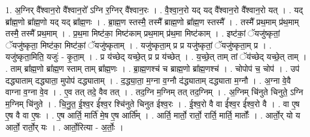 \documentclass[17pt]{extarticle}
\begin{document}
1. अ॒ग्निर् वै᳚श्वान॒रो वै᳚श्वान॒रो᳚ ऽग्नि र॒ग्निर् वै᳚श्वान॒रः । . वै॒श्वा॒न॒रो यद् यद् वै᳚श्वान॒रो वै᳚श्वान॒रो यत् । . यद् ब्रा᳚ह्म॒णो ब्रा᳚ह्म॒णो यद् यद् ब्रा᳚ह्म॒णः । . ब्रा॒ह्म॒ण स्तस्मै॒ तस्मै᳚ ब्राह्म॒णो ब्रा᳚ह्म॒ण स्तस्मै᳚ । . तस्मै᳚ प्रथ॒माम् प्र॑थ॒माम् तस्मै॒ तस्मै᳚ प्रथ॒माम् । . प्र॒थ॒मा मिष्ट॑का॒ मिष्ट॑काम् प्रथ॒माम् प्र॑थ॒मा मिष्ट॑काम् । . इष्ट॑कां॒ ॅयजु॑ष्कृतां॒ ॅयजु॑ष्कृता॒ मिष्ट॑का॒ मिष्ट॑कां॒ ॅयजु॑ष्कृताम् । . यजु॑ष्कृता॒म् प्र प्र यजु॑ष्कृतां॒ ॅयजु॑ष्कृता॒म् प्र । . यजु॑ष्कृता॒मिति॒ यजुः॑ - कृ॒ता॒म् । . प्र य॑च्छेद् यच्छे॒त् प्र प्र य॑च्छेत् । . य॒च्छे॒त् ताम् तां ॅय॑च्छेद् यच्छे॒त् ताम् । . ताम् ब्रा᳚ह्म॒णो ब्रा᳚ह्म॒ण स्ताम् ताम् ब्रा᳚ह्म॒णः । . ब्रा॒ह्म॒णश्च॑ च ब्राह्म॒णो ब्रा᳚ह्म॒णश्च॑ । . चोपोप॑ च॒ चोप॑ । . उप॑ दद्ध्याताम् दद्ध्याता॒ मुपोप॑ दद्ध्याताम् । . द॒द्ध्या॒ता॒ म॒ग्ना व॒ग्नौ द॑द्ध्याताम् दद्ध्याता म॒ग्नौ । . अ॒ग्ना वे॒वै वाग्ना व॒ग्ना वे॒व । . ए॒व तत् तदे॒ वैव तत् । . तद॒ग्नि म॒ग्निम् तत् तद॒ग्निम् । . अ॒ग्निम् चि॑नुते चिनुते॒ ऽग्नि म॒ग्निम् चि॑नुते । . चि॒नु॒त॒ ई॒श्व॒र ई᳚श्व॒र श्चि॑नुते चिनुत ईश्व॒रः । . ई॒श्व॒रो वै वा ई᳚श्व॒र ई᳚श्व॒रो वै । . वा ए॒ष ए॒ष वै वा ए॒षः । . ए॒ष आर्ति॒ मार्ति॑ मे॒ष ए॒ष आर्ति᳚म् । . आर्ति॒ मार्तो॒ रार्तो॒ रार्ति॒ मार्ति॒ मार्तोः᳚ । . आर्तो॒र् यो य आर्तो॒ रार्तो॒र् यः । . आर्तो॒रित्या - अ॒र्तोः॒ । \newline
\end{document}
